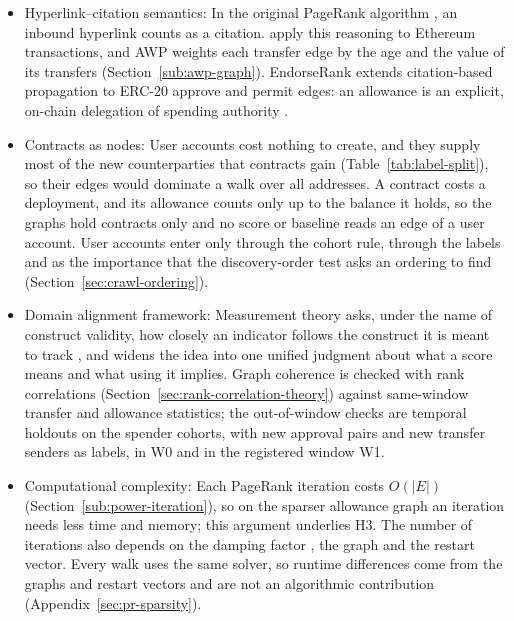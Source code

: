 \begin{itemize}
\item Hyperlink--citation semantics: In the original PageRank algorithm \parencite{page1999pagerank}, an inbound hyperlink counts as a citation. \textcite{do2023hodgerank} apply this reasoning to Ethereum transactions, and AWP \parencite{do2023awp} weights each transfer edge by the age and the value of its transfers (Section~\ref{sub:awp-graph}). EndorseRank extends citation-based propagation to ERC-20 approve and permit edges: an allowance is an explicit, on-chain delegation of spending authority \parencite{vogelsteller2015erc20}.

\item Contracts as nodes: User accounts cost nothing to create, and they supply most of the new counterparties that contracts gain (Table~\ref{tab:label-split}), so their edges would dominate a walk over all addresses. A contract costs a deployment, and its allowance counts only up to the balance it holds, so the graphs hold contracts only and no score or baseline reads an edge of a user account. User accounts enter only through the cohort rule, through the labels and as the importance that the discovery-order test asks an ordering to find (Section~\ref{sec:crawl-ordering}).

\item Domain alignment framework: Measurement theory asks, under the name of construct validity, how closely an indicator follows the construct it is meant to track \parencite{cronbach1955construct}, and \textcite{messick1995validity} widens the idea into one unified judgment about what a score means and what using it implies. Graph coherence is checked with rank correlations (Section~\ref{sec:rank-correlation-theory}) against same-window transfer and allowance statistics; the out-of-window checks are temporal holdouts on the spender cohorts, with new approval pairs and new transfer senders as labels, in W0 and in the registered window W1.

\item Computational complexity: Each PageRank iteration costs $O(|E|)$ (Section~\ref{sub:power-iteration}), so on the sparser allowance graph an iteration needs less time and memory; this argument underlies H3. The number of iterations also depends on the damping factor \parencite{langville2006pagerank}, the graph and the restart vector. Every walk uses the same solver, so runtime differences come from the graphs and restart vectors and are not an algorithmic contribution (Appendix~\ref{sec:pr-sparsity}).


\end{itemize}
